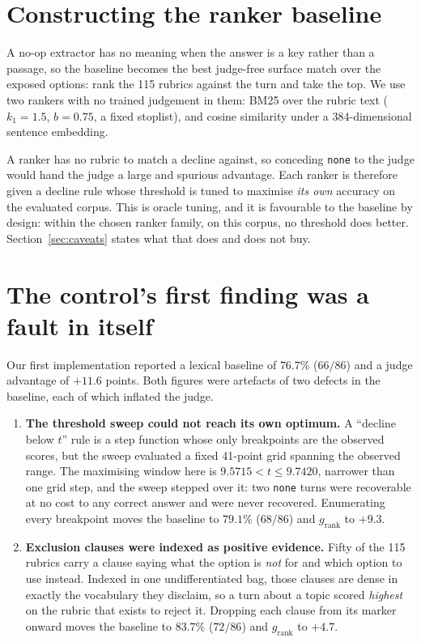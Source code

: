 \documentclass[10pt,twocolumn]{article}
\newcommand{\grank}{$g_{\mathrm{rank}}$}
\begin{document}
\section{Constructing the ranker baseline}\label{sec:baseline}
A no-op extractor has no meaning when the answer is a key rather than a passage, so the
baseline becomes the best judge-free surface match over the exposed options: rank the 115
rubrics against the turn and take the top. We use two rankers with no trained judgement in
them: BM25 over the rubric text ($k_1{=}1.5$, $b{=}0.75$, a fixed stoplist), and cosine
similarity under a 384-dimensional sentence embedding.

A ranker has no rubric to match a decline against, so conceding \texttt{none} to the judge
would hand the judge a large and spurious advantage. Each ranker is therefore given a decline
rule whose threshold is tuned to maximise \emph{its own} accuracy on the evaluated corpus.
This is oracle tuning, and it is favourable to the baseline by design: within the chosen
ranker family, on this corpus, no threshold does better. Section~\ref{sec:caveats} states
what that does and does not buy.

\section{The control's first finding was a fault in itself}\label{sec:selffault}
Our first implementation reported a lexical baseline of $76.7\%$ ($66/86$) and a judge
advantage of $+11.6$ points. Both figures were artefacts of two defects in the baseline,
each of which inflated the judge.

\begin{enumerate}[topsep=2pt,itemsep=3pt,leftmargin=1.6em]
\item \textbf{The threshold sweep could not reach its own optimum.} A ``decline below $t$''
rule is a step function whose only breakpoints are the observed scores, but the sweep
evaluated a fixed 41-point grid spanning the observed range. The maximising window here is
$9.5715 < t \leq 9.7420$, narrower than one grid step, and the sweep stepped over it: two
\texttt{none} turns were recoverable at no cost to any correct answer and were never
recovered. Enumerating every breakpoint moves the baseline to $79.1\%$ ($68/86$) and \grank{}
to $+9.3$.
\item \textbf{Exclusion clauses were indexed as positive evidence.} Fifty of the 115 rubrics
carry a clause saying what the option is \emph{not} for and which option to use instead.
Indexed in one undifferentiated bag, those clauses are dense in exactly the vocabulary they
disclaim, so a turn about a topic scored \emph{highest} on the rubric that exists to reject
it. Dropping each clause from its marker onward moves the baseline to $83.7\%$ ($72/86$) and
\grank{} to $+4.7$.
\end{enumerate}
\end{document}
